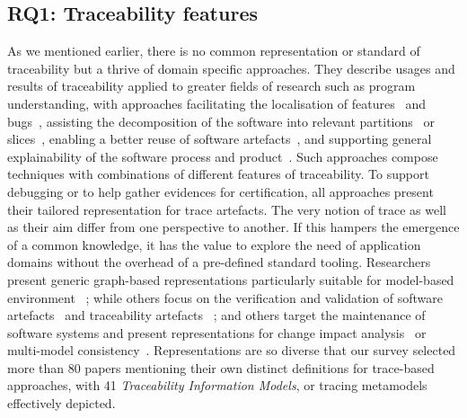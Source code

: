 \subsection{RQ1: Traceability features}\label{sec:traceaMDE}
As we mentioned earlier, there is no common representation or standard of traceability but a thrive of domain specific approaches. They describe usages and results of traceability applied to greater fields of research such as program understanding, with approaches facilitating the localisation of features~\cite{seiler2019-comparing-trac-through-IR-Commits-Logs} and bugs~\cite{ko2008-whyline-debugging}, assisting the decomposition of the software into relevant partitions~\cite{laghouaouta2017-model-composition-tracaebility} or slices~\cite{nejat2012-traceability-sysml-safety-certification}, enabling a better reuse of software artefacts~\cite{tinnes2019-improving-art-reuse-with-traceability}, and supporting general explainability of the software process and product~\cite{wohlrab2020-traceability-organization-process-culture}. 
Such approaches compose techniques with combinations of different features of traceability. To support debugging or to help gather evidences for certification, all approaches present their tailored representation for trace artefacts. The very notion of trace as well as their aim differ from one perspective to another. If this hampers the emergence of a common knowledge, it has the value to explore the need of application domains without the overhead of a pre-defined standard tooling. Researchers present generic graph-based representations particularly suitable for model-based environment~\cite{schwarz2010-graph-based-traceability,grammel2012-model-matching-for-traceability-in-MDE} ; while others focus on  the verification and validation of software artefacts~\cite{Dubois_2010,vonknethen2002-change-oriented-req-traceability-evolution-of-embedded-systems} and traceability artefacts~\cite{rempl2014-conformance-of-traceability-to-guidelines} ; and others target the maintenance of software systems and present representations for change impact analysis~\cite{goknil2014-change-impact-analysis-for-requirement-metamodel} or multi-model consistency~\cite{Szabo_2013}. Representations are so diverse that our survey selected more than 80 papers mentioning their own distinct definitions for trace-based approaches, with 41 \textit{Traceability Information Models}, or tracing metamodels effectively depicted. 

